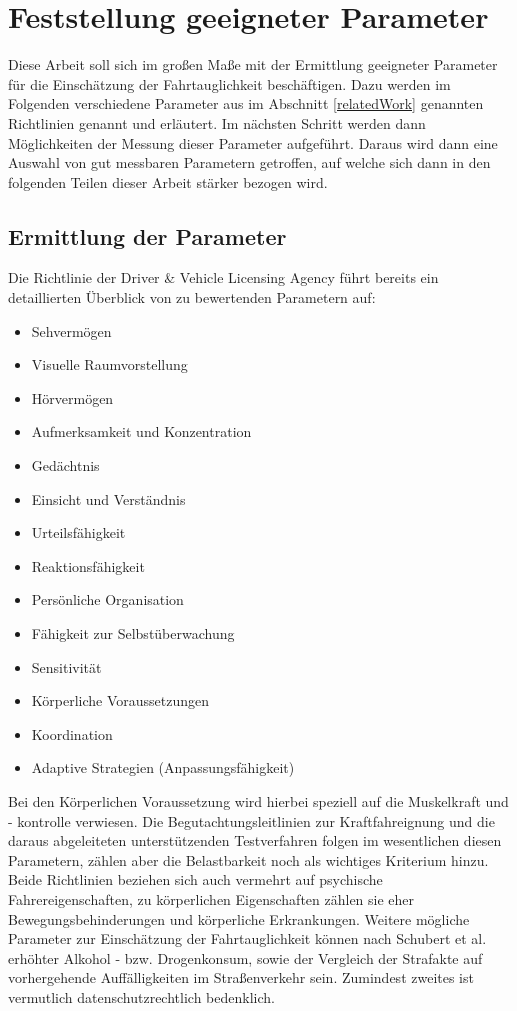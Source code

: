 \section{Feststellung geeigneter Parameter}
\label{parameters}

Diese Arbeit soll sich im großen Maße mit der Ermittlung geeigneter Parameter für die Einschätzung der Fahrtauglichkeit beschäftigen. Dazu werden im Folgenden verschiedene Parameter aus im Abschnitt \ref{relatedWork} genannten Richtlinien genannt und erläutert. Im nächsten Schritt werden dann Möglichkeiten der Messung dieser Parameter aufgeführt. Daraus wird dann eine Auswahl von gut messbaren Parametern getroffen, auf welche sich dann in den folgenden Teilen dieser Arbeit stärker bezogen wird.
\subsection{Ermittlung der Parameter}

Die Richtlinie der Driver \& Vehicle Licensing Agency \cite{drivervehiclelicencingagency} führt bereits ein detaillierten Überblick von zu bewertenden Parametern auf:

\begin{multicols}{2}
\begin{itemize}
	\item Sehvermögen
	\item Visuelle Raumvorstellung
	\item Hörvermögen
	\item Aufmerksamkeit und Konzentration
	\item Gedächtnis
	\item Einsicht und Verständnis
	\item Urteilsfähigkeit
	\item Reaktionsfähigkeit
	\item Persönliche Organisation
	\item Fähigkeit zur Selbstüberwachung
	\item Sensitivität
	\item Körperliche Voraussetzungen
	\item Koordination
	\item Adaptive Strategien (Anpassungsfähigkeit)
\end{itemize}
\end{multicols}

Bei den Körperlichen Voraussetzung wird hierbei speziell auf die Muskelkraft und - kontrolle verwiesen. Die Begutachtungsleitlinien zur Kraftfahreignung \cite{begutachtungsrichtlinien} und die daraus abgeleiteten unterstützenden Testverfahren \cite{testverfahrenpsychometrischefahreignung} folgen im wesentlichen diesen Parametern, zählen aber die Belastbarkeit noch als wichtiges Kriterium hinzu. Beide Richtlinien beziehen sich auch vermehrt auf psychische Fahrereigenschaften, zu körperlichen Eigenschaften zählen sie eher Bewegungsbehinderungen und körperliche Erkrankungen. Weitere mögliche Parameter zur Einschätzung der Fahrtauglichkeit können nach Schubert et al. \cite{beurteilungskriterien} erhöhter Alkohol - bzw. Drogenkonsum, sowie der Vergleich der Strafakte auf vorhergehende Auffälligkeiten im Straßenverkehr sein. Zumindest zweites ist vermutlich datenschutzrechtlich bedenklich.

